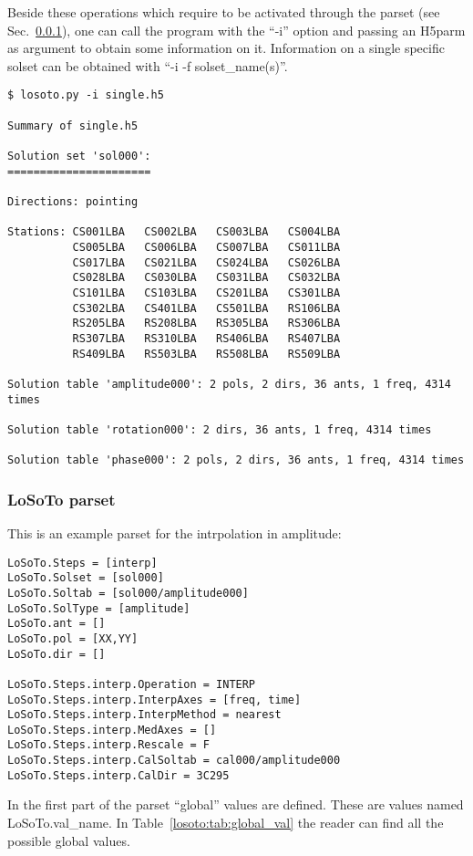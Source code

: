 \documentclass[structabstract]{article}
\begin{document}
Beside these operations which require to be activated through the \losoto{} parset (see Sec.~\ref{losoto:parset}), one can call the program with the ``-i'' option and passing an H5parm as argument to obtain some information on it. Information on a single specific solset can be obtained with ``-i -f solset\_name(s)''.

\begin{verbatim}
$ losoto.py -i single.h5

Summary of single.h5

Solution set 'sol000':
======================

Directions: pointing
            
Stations: CS001LBA   CS002LBA   CS003LBA   CS004LBA  
          CS005LBA   CS006LBA   CS007LBA   CS011LBA  
          CS017LBA   CS021LBA   CS024LBA   CS026LBA  
          CS028LBA   CS030LBA   CS031LBA   CS032LBA  
          CS101LBA   CS103LBA   CS201LBA   CS301LBA  
          CS302LBA   CS401LBA   CS501LBA   RS106LBA  
          RS205LBA   RS208LBA   RS305LBA   RS306LBA  
          RS307LBA   RS310LBA   RS406LBA   RS407LBA  
          RS409LBA   RS503LBA   RS508LBA   RS509LBA  
          
Solution table 'amplitude000': 2 pols, 2 dirs, 36 ants, 1 freq, 4314 times

Solution table 'rotation000': 2 dirs, 36 ants, 1 freq, 4314 times

Solution table 'phase000': 2 pols, 2 dirs, 36 ants, 1 freq, 4314 times
\end{verbatim}

\subsubsection{LoSoTo parset}
\label{losoto:parset}

This is an example parset for the intrpolation in amplitude:
\begin{verbatim}
LoSoTo.Steps = [interp]
LoSoTo.Solset = [sol000]
LoSoTo.Soltab = [sol000/amplitude000]
LoSoTo.SolType = [amplitude]
LoSoTo.ant = []
LoSoTo.pol = [XX,YY]
LoSoTo.dir = []

LoSoTo.Steps.interp.Operation = INTERP
LoSoTo.Steps.interp.InterpAxes = [freq, time]
LoSoTo.Steps.interp.InterpMethod = nearest
LoSoTo.Steps.interp.MedAxes = []
LoSoTo.Steps.interp.Rescale = F
LoSoTo.Steps.interp.CalSoltab = cal000/amplitude000
LoSoTo.Steps.interp.CalDir = 3C295
\end{verbatim}

In the first part of the parset ``global'' values are defined. These are values named LoSoTo.val\_name. In Table~\ref{losoto:tab:global_val} the reader can find all the possible global values.
\end{document}
